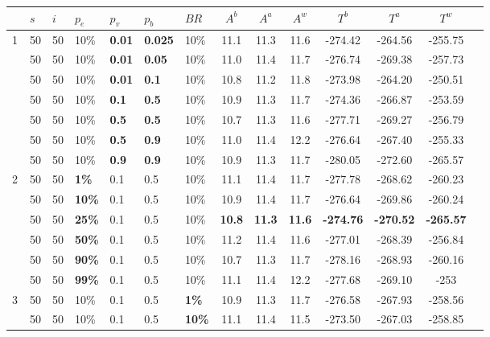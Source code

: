 \begin{table}
    \hspace*{-2cm}
    \begin{tabular}{|l|l|l|l|l|l|l||c|c|c|c|c|c|c|}
    \hline
    ~ & $s$ & $i$ & $p_{e}$ & $p_{v}$ & $p_{b}$ & $BR$ & $A^b$ & $A^a$ & $A^w$ & $T^b$ & $T^a$ & $T^w$\\
    \hline
    1 & 50 & 50 & 10\% & \textbf{0.01} & \textbf{0.025} & 10\% & 11.1 & 11.3 & 11.6 & -274.42 & -264.56 & -255.75 \\
    ~ & 50 & 50 & 10\% & \textbf{0.01} & \textbf{0.05} & 10\% & 11.0 & 11.4 & 11.7 & -276.74 & -269.38 & -257.73 \\
    ~ & 50 & 50 & 10\% & \textbf{0.01} & \textbf{0.1} & 10\% & 10.8 & 11.2 & 11.8 & -273.98 & -264.20 & -250.51 \\
    ~ & 50 & 50 & 10\% & \textbf{0.1} & \textbf{0.5} & 10\% & 10.9 & 11.3 & 11.7 & -274.36 & -266.87 & -253.59 \\
    ~ & 50 & 50 & 10\% & \textbf{0.5} & \textbf{0.5} & 10\% & 10.7 & 11.3 & 11.6 & -277.71 & -269.27 & -256.79 \\
    ~ & 50 & 50 & 10\% & \textbf{0.5} & \textbf{0.9} & 10\% & 11.0 & 11.4 & 12.2 & -276.64 & -267.40 & -255.33 \\
    ~ & 50 & 50 & 10\% & \textbf{0.9} & \textbf{0.9} & 10\% & 10.9 & 11.3 & 11.7 & -280.05 & -272.60 & -265.57 \\
    \hline
    2 & 50 & 50 & \textbf{1\%} & 0.1 & 0.5 & 10\% & 11.1 & 11.4 & 11.7 & -277.78 & -268.62 & -260.23 \\
    ~ & 50 & 50 & \textbf{10\%} & 0.1 & 0.5 & 10\% & 10.9 & 11.4 & 11.7 & -276.64 & -269.86 & -260.24 \\
    ~ & 50 & 50 & \textbf{25\%} & 0.1 & 0.5 & 10\% &  \textbf{10.8} & \textbf{11.3} & \textbf{11.6} & \textbf{-274.76} & \textbf{-270.52} & \textbf{-265.57} \\
    ~ & 50 & 50 & \textbf{50\%} & 0.1 & 0.5 & 10\% &  11.2 & 11.4 & 11.6 & -277.01 & -268.39 & -256.84 \\
    ~ & 50 & 50 & \textbf{90\%} & 0.1 & 0.5 & 10\% & 10.7 & 11.3 & 11.7 & -278.16 & -268.93 & -260.16 \\
    ~ & 50 & 50 & \textbf{99\%} & 0.1 & 0.5 & 10\% & 11.1 & 11.4 & 12.2 & -277.68 & -269.10 & -253 \\
    \hline
    3 & 50 & 50 & 10\% & 0.1 & 0.5 & \textbf{1\%} & 10.9 & 11.3 & 11.7 & -276.58 & -267.93 & -258.56 \\
    ~ & 50 & 50 & 10\% & 0.1 & 0.5 & \textbf{10\%} & 11.1 & 11.4 & 11.5 & -273.50 & -267.03 & -258.85 \\

\end{tabular}
\end{table}
